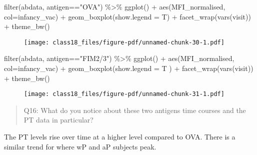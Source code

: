 \documentclass[
  letterpaper,
  DIV=11,
  numbers=noendperiod]{scrartcl}
\newenvironment{Shaded}{\begin{snugshade}}{\end{snugshade}}
\newcommand{\AttributeTok}[1]{\textcolor[rgb]{0.40,0.45,0.13}{#1}}
\newcommand{\FunctionTok}[1]{\textcolor[rgb]{0.28,0.35,0.67}{#1}}
\newcommand{\NormalTok}[1]{\textcolor[rgb]{0.00,0.23,0.31}{#1}}
\newcommand{\SpecialCharTok}[1]{\textcolor[rgb]{0.37,0.37,0.37}{#1}}
\newcommand{\StringTok}[1]{\textcolor[rgb]{0.13,0.47,0.30}{#1}}
\begin{document}
\begin{Shaded}
\begin{Highlighting}[]
\FunctionTok{filter}\NormalTok{(abdata, antigen}\SpecialCharTok{==}\StringTok{"OVA"}\NormalTok{) }\SpecialCharTok{\%\textgreater{}\%}
  \FunctionTok{ggplot}\NormalTok{() }\SpecialCharTok{+}
  \FunctionTok{aes}\NormalTok{(MFI\_normalised, }\AttributeTok{col=}\NormalTok{infancy\_vac) }\SpecialCharTok{+}
  \FunctionTok{geom\_boxplot}\NormalTok{(}\AttributeTok{show.legend =}\NormalTok{ T) }\SpecialCharTok{+}
  \FunctionTok{facet\_wrap}\NormalTok{(}\FunctionTok{vars}\NormalTok{(visit)) }\SpecialCharTok{+}
  \FunctionTok{theme\_bw}\NormalTok{()}
\end{Highlighting}
\end{Shaded}

\begin{figure}[H]

{\centering \texttt{[image: class18\_files/figure-pdf/unnamed-chunk-30-1.pdf]}

}

\end{figure}

\begin{Shaded}
\begin{Highlighting}[]
\FunctionTok{filter}\NormalTok{(abdata, antigen}\SpecialCharTok{==}\StringTok{"FIM2/3"}\NormalTok{) }\SpecialCharTok{\%\textgreater{}\%}
  \FunctionTok{ggplot}\NormalTok{() }\SpecialCharTok{+}
  \FunctionTok{aes}\NormalTok{(MFI\_normalised, }\AttributeTok{col=}\NormalTok{infancy\_vac) }\SpecialCharTok{+}
  \FunctionTok{geom\_boxplot}\NormalTok{(}\AttributeTok{show.legend =}\NormalTok{ T ) }\SpecialCharTok{+}
  \FunctionTok{facet\_wrap}\NormalTok{(}\FunctionTok{vars}\NormalTok{(visit)) }\SpecialCharTok{+}
  \FunctionTok{theme\_bw}\NormalTok{()}
\end{Highlighting}
\end{Shaded}

\begin{figure}[H]

{\centering \texttt{[image: class18\_files/figure-pdf/unnamed-chunk-31-1.pdf]}

}

\end{figure}

\begin{quote}
Q16: What do you notice about these two antigens time courses and the PT
data in particular?
\end{quote}

The PT levels rise over time at a higher level compared to OVA. There is
a similar trend for where wP and aP subjects peak.
\end{document}
